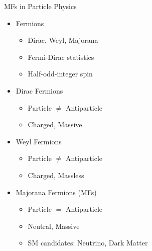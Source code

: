 \documentclass[xcolor=dvipsnames,10pt,aspectratio=169]{beamer}
\begin{document}
\begin{frame}{MFs in Particle Physics}
\begin{multicols}{2}
      \begin{itemize}
        \setlength\itemsep{0pt}
        \small
        \item Fermions
          \begin{itemize}
            \item Dirac, Weyl, Majorana
            \item Fermi-Dirac statistics
            \item Half-odd-integer spin
          \end{itemize}
      \end{itemize}
      \begin{itemize}
        \setlength\itemsep{0pt}
        \small
        \item  Dirac Fermions
        \begin{itemize}
          \item Particle $\neq$ Antiparticle
          \item Charged, Massive
        \end{itemize}
      \end{itemize}

      \begin{itemize}
        \setlength\itemsep{0pt}
        \small
        \item  Weyl Fermions
        \begin{itemize}
          \item Particle $\neq$ Antiparticle
          \item Charged, Massless
        \end{itemize}
      \end{itemize}

      \begin{itemize}
        \setlength\itemsep{0pt}
        \small
        \item Majorana Fermions (MFs)
        \begin{itemize}
            \item Particle $=$ Antiparticle
            \item Neutral, Massive
            \item SM candidates: Neutrino, Dark Matter
        \end{itemize}
      \end{itemize}

    \end{multicols}

  \end{frame}
\end{document}
